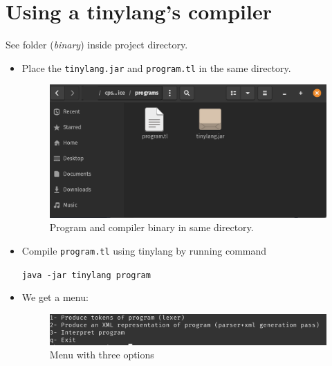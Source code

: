 \section{Using a tinylang's compiler}
See folder (\emph{binary}) inside project directory.
\begin{itemize}
	\item Place the \verb!tinylang.jar! and \verb!program.tl! in the same directory.
	      \begin{figure}[H]
	      	\centering
	      	\includegraphics[scale=0.5]{Introduction/images/same_directory.png}
	      	\caption{Program and compiler binary in same directory.}
	      	\label{fig:placed in the same directory}
	      \end{figure}
	\item Compile \verb!program.tl! using tinylang by running command 
	      	          
	      \verb!java -jar tinylang program!
	\item We get a menu:
	      \begin{figure}[H]
	      	\centering
	      	\includegraphics[scale=0.6]{Introduction/images/menu.png}
	      	\caption{Menu with three options}
	      	\label{fig:three-option-menu}
	      \end{figure}
	      	      

\end{itemize}
